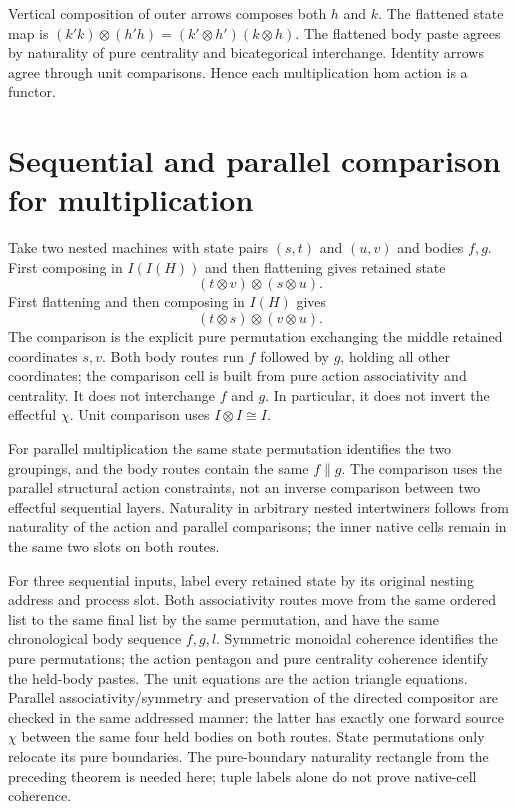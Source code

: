 \documentclass{article}
\begin{document}
Vertical composition of outer arrows composes both $h$ and $k$. The flattened state map is $(k'k)\otimes(h'h)=(k'\otimes h')(k\otimes h)$. The flattened body paste agrees by naturality of pure centrality and bicategorical interchange. Identity arrows agree through unit comparisons. Hence each multiplication hom action is a functor.

\section{Sequential and parallel comparison for multiplication}
Take two nested machines with state pairs $(s,t)$ and $(u,v)$ and bodies $f,g$. First composing in $I(I(H))$ and then flattening gives retained state
\[
(t\otimes v)\otimes(s\otimes u).
\]
First flattening and then composing in $I(H)$ gives
\[
(t\otimes s)\otimes(v\otimes u).
\]
The comparison is the explicit pure permutation exchanging the middle retained coordinates $s,v$. Both body routes run $f$ followed by $g$, holding all other coordinates; the comparison cell is built from pure action associativity and centrality. It does not interchange $f$ and $g$. In particular, it does not invert the effectful $\chi$. Unit comparison uses $I\otimes I\cong I$.

For parallel multiplication the same state permutation identifies the two groupings, and the body routes contain the same $f\parallel g$. The comparison uses the parallel structural action constraints, not an inverse comparison between two effectful sequential layers. Naturality in arbitrary nested intertwiners follows from naturality of the action and parallel comparisons; the inner native cells remain in the same two slots on both routes.

For three sequential inputs, label every retained state by its original nesting address and process slot. Both associativity routes move from the same ordered list to the same final list by the same permutation, and have the same chronological body sequence $f,g,l$. Symmetric monoidal coherence identifies the pure permutations; the action pentagon and pure centrality coherence identify the held-body pastes. The unit equations are the action triangle equations. Parallel associativity/symmetry and preservation of the directed compositor are checked in the same addressed manner: the latter has exactly one forward source $\chi$ between the same four held bodies on both routes. State permutations only relocate its pure boundaries. The pure-boundary naturality rectangle from the preceding theorem is needed here; tuple labels alone do not prove native-cell coherence.
\end{document}
